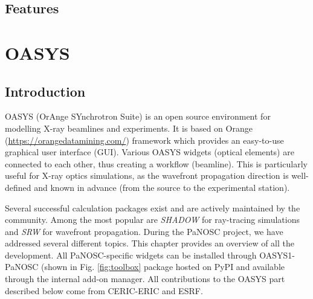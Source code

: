 \documentclass[11pt, a4paper]{article}
\begin{document}
\subsection{Features}


\section{OASYS}

\subsection{Introduction}

OASYS (OrAnge SYnchrotron Suite) is an open source environment for modelling X-ray beamlines and experiments. It is based on Orange (\url{https://orangedatamining.com/}) framework which provides an easy-to-use graphical user interface (GUI). Various OASYS widgets (optical elements) are connected to each other, thus creating a workflow (beamline). This is particularly useful for X-ray optics simulations, as the wavefront propagation direction is well-defined and known in advance (from the source to the experimental station).

Several successful calculation packages exist and are actively maintained by the community. Among the most popular are \emph{SHADOW} for ray-tracing simulations and \emph{SRW} for wavefront propagation. During the PaNOSC project, we have addressed several different topics. This chapter provides an overview of all the development. All PaNOSC-specific widgets can be installed through OASYS1-PaNOSC (shown in Fig. \ref{fig:toolbox} package hosted on PyPI and available through the internal add-on manager. All contributions to the OASYS part described below come from CERIC-ERIC and ESRF.
\end{document}
